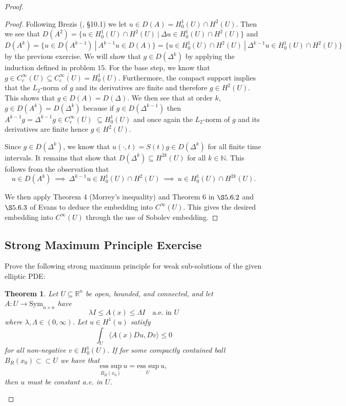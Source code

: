 \documentclass{article}
\newtheorem{theorem}{Theorem}
\begin{document}
\begin{flushleft}
\begin{proof}
\begin{proof}
Following Brezis (\cite{Brezis_2010}, \S 10.1) we let $u\in D(A)=H_0^1(U) \cap H^2(U)$. Then we see that $D(A^2)=\{u\in H_0^1(U)\cap H^2(U) ~|~ \Delta u \in H_0^1(U)\cap H^2(U)\}$ and $D(A^k)=\{u\in D(A^{k-1})~|~A^{k-1}u\in D(A)\}=\{u\in H_0^1(U)\cap H^2(U) ~|~ \Delta^{k-1} u \in H_0^1(U)\cap H^2(U)\}$ by the previous exercise. We will show that $g\in D(\Delta^k)$ by applying the induction defined in problem $15$. For the base step, we know that $g\in C_c^{\infty}(U)\subseteq \overline{C_c^{\infty}(U)}=H_0^1(U)$. Furthermore, the compact support implies that the $L_2$-norm of $g$ and its derivatives are finite and therefore $g\in H^2(U)$. This shows that $g\in D(A)=D(\Delta)$.  We then see that at order $k$, $g\in D(A^k)=D(\Delta^k)$ because if $g\in D(\Delta^{k-1})$ then $A^{k-1}g=\Delta^{k-1}g\in C_c^{\infty}(U)$ $\subseteq H_0^1(U)$ and once again the $L_2$-norm of $g$ and its derivatives are finite hence $g\in H^2(U)$.

Since $g\in D(\Delta^k)$, we know that $u(\cdot,t)=S(t)g\in D(\Delta^k)$ for all finite time intervals. It remains that show that $D(\Delta^k) \subseteq H^{2k}(U)$ for all $k\in\mathbb N$. This follows from the observation that $$u\in D(A^k)~ \implies ~\Delta^{k-1}u\in H_0^1(U)\cap H^2(U)~ \implies ~ u\in H_0^1(U)\cap H^{2k}(U).$$

We then apply Theorem $4$ (Morrey's inequality) and Theorem $6$ in $\S 5.6.2$ and $\S 5.6.3$ of Evans to deduce the embedding into $C^{\infty}(U)$. This gives the desired embedding into $C^{\infty}(U)$ through the use of Sobolev embedding.
\end{proof}
\subsection{\textbf{Strong Maximum Principle Exercise}} Prove the following strong maximum principle for weak sub-solutions of the given elliptic PDE:
\begin{theorem}
Let $U\subseteq \mathbb R^n$ be open, bounded, and connected, and let $A:U \to \text{Sym}_{n\times n}$ have
$$\lambda I \le A(x) \le \Lambda I \quad \text{a.e. in $U$}$$
where $\lambda,\Lambda \in(0,\infty)$. Let $u\in H^1(u)$ satisfy
$$\int_U \langle A(x)Du,Dv\rangle \le 0$$
for all non-negative $v\in H_0^1(U)$. If for some compactly contained ball $B_R(x_0)\subset \subset U$ we have that
$$\underset{B_R(x_0)}{\text{ess sup}}~u = \underset{U}{\text{ess sup}}~ u,$$
then $u$ must be constant a.e. in $U$.
\end{theorem}


\end{proof}
\end{flushleft}
\end{document}
